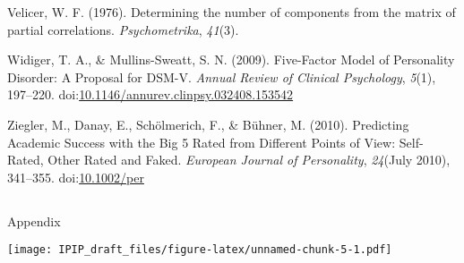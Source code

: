 \documentclass[man]{apa6}
\theoremstyle{definition}
\theoremstyle{definition}
\theoremstyle{definition}
\theoremstyle{remark}
\begin{document}
\leavevmode\hypertarget{ref-Velicer1976}{}%
Velicer, W. F. (1976). Determining the number of components from the
matrix of partial correlations. \emph{Psychometrika}, \emph{41}(3).

\leavevmode\hypertarget{ref-WidigerMullins2009}{}%
Widiger, T. A., \& Mullins-Sweatt, S. N. (2009). Five-Factor Model of
Personality Disorder: A Proposal for DSM-V. \emph{Annual Review of
Clinical Psychology}, \emph{5}(1), 197--220.
doi:\href{https://doi.org/10.1146/annurev.clinpsy.032408.153542}{10.1146/annurev.clinpsy.032408.153542}

\leavevmode\hypertarget{ref-Ziegler2010}{}%
Ziegler, M., Danay, E., Schölmerich, F., \& Bühner, M. (2010).
Predicting Academic Success with the Big 5 Rated from Different Points
of View: Self-Rated, Other Rated and Faked. \emph{European Journal of
Personality}, \emph{24}(July 2010), 341--355.
doi:\href{https://doi.org/10.1002/per}{10.1002/per}

\endgroup


\clearpage
\renewcommand{\listtablename}{Table captions}
\listoftables



  \clearpage
  \makeatletter
  \efloat@restorefloats
  \makeatother
  
  
\begin{appendix}
\section{}
Appendix

\texttt{[image: IPIP\_draft\_files/figure-latex/unnamed-chunk-5-1.pdf]}
\end{appendix}
\end{document}
